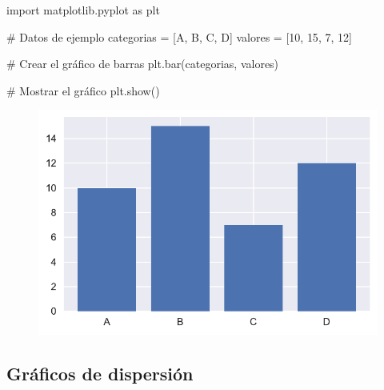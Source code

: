 \documentclass[
  a4paper,
]{article}
\newenvironment{Shaded}{}{}
\newcommand{\CommentTok}[1]{\textcolor[rgb]{0.42,0.45,0.49}{#1}}
\newcommand{\DecValTok}[1]{\textcolor[rgb]{0.00,0.36,0.77}{#1}}
\newcommand{\ImportTok}[1]{\textcolor[rgb]{0.01,0.18,0.38}{#1}}
\newcommand{\NormalTok}[1]{\textcolor[rgb]{0.14,0.16,0.18}{#1}}
\newcommand{\OperatorTok}[1]{\textcolor[rgb]{0.14,0.16,0.18}{#1}}
\newcommand{\StringTok}[1]{\textcolor[rgb]{0.01,0.18,0.38}{#1}}
\begin{document}
\begin{Shaded}
\begin{Highlighting}[]
\ImportTok{import}\NormalTok{ matplotlib.pyplot }\ImportTok{as}\NormalTok{ plt}

\CommentTok{\# Datos de ejemplo}
\NormalTok{categorias }\OperatorTok{=}\NormalTok{ [}\StringTok{\textquotesingle{}A\textquotesingle{}}\NormalTok{, }\StringTok{\textquotesingle{}B\textquotesingle{}}\NormalTok{, }\StringTok{\textquotesingle{}C\textquotesingle{}}\NormalTok{, }\StringTok{\textquotesingle{}D\textquotesingle{}}\NormalTok{]}
\NormalTok{valores }\OperatorTok{=}\NormalTok{ [}\DecValTok{10}\NormalTok{, }\DecValTok{15}\NormalTok{, }\DecValTok{7}\NormalTok{, }\DecValTok{12}\NormalTok{]}

\CommentTok{\# Crear el gráfico de barras}
\NormalTok{plt.bar(categorias, valores)}

\CommentTok{\# Mostrar el gráfico}
\NormalTok{plt.show()}
\end{Highlighting}
\end{Shaded}

\begin{figure}[H]

{\centering \includegraphics{index_files/figure-pdf/cell-3-output-1.pdf}

}

\end{figure}

\hypertarget{gruxe1ficos-de-dispersiuxf3n}{%
\subsection{Gráficos de dispersión}\label{gruxe1ficos-de-dispersiuxf3n}}
\end{document}
